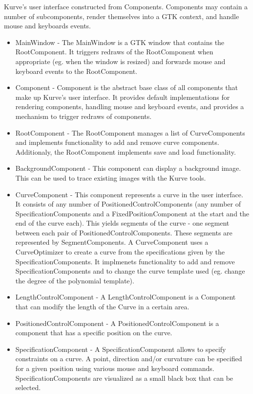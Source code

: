 \documentclass[a4paper]{article}
\begin{document}
				Kurve's user interface constructed from Components. Components may contain a number of subcomponents, render themselves into a GTK context, and handle mouse and keyboards events. 
				\begin{itemize} 
					\item MainWindow - The MainWindow is a GTK window that contains the RootComponent. It triggers redraws of the RootComponent when appropriate (eg. when the window is resized) and forwards mouse and keyboard events to the RootComponent.
					\item Component - Component is the abstract base class of all components that make up Kurve's user interface. It provides default implementations for rendering components, handling mouse and keyboard events, and provides a mechanism to trigger redraws of components.
					\item RootComponent - The RootComponent manages a list of CurveComponents and implements functionality to add and remove curve components. Additionaly, the RootComponent implements save and load functionality.
					\item BackgroundComponent - This component can display a background image. This can be used to trace existing images with the Kurve tools.
					\item CurveComponent - This component represents a curve in the user interface. It consists of any number of PositionedControlComponents (any number of SpecificationComponents and a FixedPositionComponent at the start and the end of the curve each). This yields segments of the curve - one segment between each pair of PositionedControlComponents. These segments are represented by SegmentComponents. A CurveComponent uses a CurveOptimizer to create a curve from the specifications given by the SpecificationComponents. It implmenets functionality to add and remove SpecificationComponents and to change the curve template used (eg. change the degree of the polynomial template). 
					\item LengthControlComponent - A LengthControlComponent is a Component that can modify the length of the Curve in a certain area.
					\item PositionedControlComponent - A PositionedControlComponent is a component that has a specific position on the curve. 
					\item SpecificationComponent - A SpecificationComponent allows to specify constraints on a curve. A point, direction and/or curvature can be specified for a given position using various mouse and keyboard commands. SpecificationComponents are visualized as a small black box that can be selected.

\end{itemize}
\end{document}

